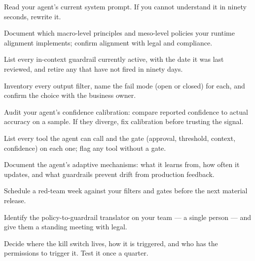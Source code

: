 \begin{TNchecklist}
\item Read your agent's current system prompt. If you cannot understand it in ninety seconds, rewrite it.
\item Document which macro-level principles and meso-level policies your runtime alignment implements; confirm alignment with legal and compliance.
\item List every in-context guardrail currently active, with the date it was last reviewed, and retire any that have not fired in ninety days.
\item Inventory every output filter, name the fail mode (open or closed) for each, and confirm the choice with the business owner.
\item Audit your agent's confidence calibration: compare reported confidence to actual accuracy on a sample. If they diverge, fix calibration before trusting the signal.
\item List every tool the agent can call and the gate (approval, threshold, context, confidence) on each one; flag any tool without a gate.
\item Document the agent's adaptive mechanisms: what it learns from, how often it updates, and what guardrails prevent drift from production feedback.
\item Schedule a red-team week against your filters and gates before the next material release.
\item Identify the policy-to-guardrail translator on your team --- a single person --- and give them a standing meeting with legal.
\item Decide where the kill switch lives, how it is triggered, and who has the permissions to trigger it. Test it once a quarter.
\end{TNchecklist}
